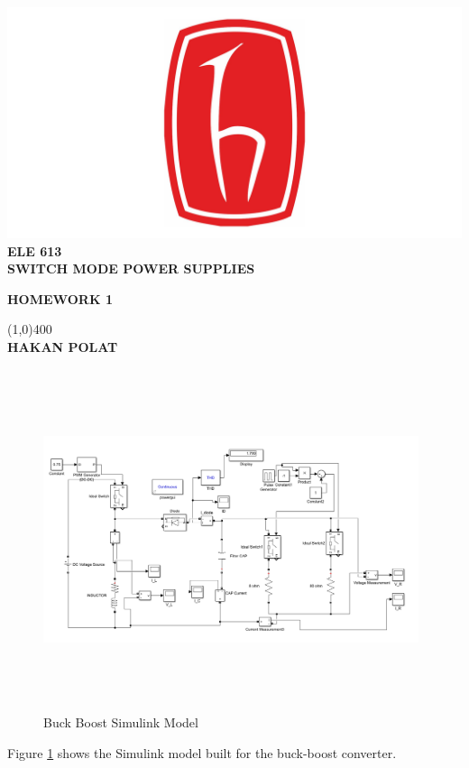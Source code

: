 \documentclass[oneside,12pt]{article}
\begin{document}
\begin{titlepage}
	\begin{center}
		
		\includegraphics[scale=0.7]{hulogo}\\
		\vspace{1cm}
		\large\textbf{ELE 613}\\
		\vspace{0.5cm}
		\large\textbf{SWITCH MODE POWER SUPPLIES}\\ 
		\vspace{0.5cm}
		
		\small\textbf{HOMEWORK 1}\\

		\vspace{0.5cm}
		
		\vspace{0.5cm}
		
		\line(1,0){400}\\
		\vspace{0.5cm}
	    \Large\textbf{HAKAN POLAT} 
	\end{center}
	

\end{titlepage}
\newpage



\begin{figure}[H]
	\centering
	\includegraphics[width=11cm, height=10cm]{"Buck Boost Simulink Model"}
	\caption{ Buck Boost Simulink Model}
	\label{fig:buck-boost-simulink-model}
\end{figure}
Figure \ref{fig:buck-boost-simulink-model} shows the Simulink model built for the buck-boost converter.
\end{document}
